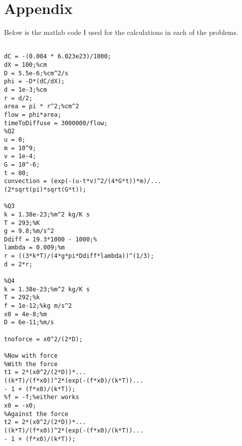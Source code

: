 \documentclass[12pt]{article}
\begin{document}
\section{Appendix}
Below is the matlab code I used for the calculations in each of the problems.
\begin{lstlisting}[style=Matlab-editor]
%Q1

dC = -(0.004 * 6.023e23)/1000;
dX = 100;%cm
D = 5.5e-6;%cm^2/s
phi = -D*(dC/dX);
d = 1e-3;%cm
r = d/2;
area = pi * r^2;%cm^2
flow = phi*area;
timeToDiffuse = 3000000/flow;
%Q2
u = 0;
m = 10^9;
v = 1e-4;
G = 10^-6;
t = 80;
convection = (exp(-(u-t*v)^2/(4*G*t))*m)/...
(2*sqrt(pi)*sqrt(G*t));

%Q3
k = 1.38e-23;%m^2 kg/K s
T = 293;%K
g = 9.8;%m/s^2
Ddiff = 19.3*1000 - 1000;%
lambda = 0.009;%m
r = ((3*k*T)/(4*g*pi*Ddiff*lambda))^(1/3);
d = 2*r;

%Q4
k = 1.38e-23;%m^2 kg/K s
T = 292;%k
f = 1e-12;%kg m/s^2
x0 = 4e-8;%m
D = 6e-11;%m/s

tnoforce = x0^2/(2*D);

%Now with force
%With the force
t1 = 2*(x0^2/(2*D))*...
((k*T)/(f*x0))^2*(exp(-(f*x0)/(k*T))...
- 1 + (f*x0)/(k*T));
%f = -f;%either works
x0 = -x0;
%Against the force
t2 = 2*(x0^2/(2*D))*...
((k*T)/(f*x0))^2*(exp(-(f*x0)/(k*T))...
- 1 + (f*x0)/(k*T));



\end{lstlisting}
\end{document}
